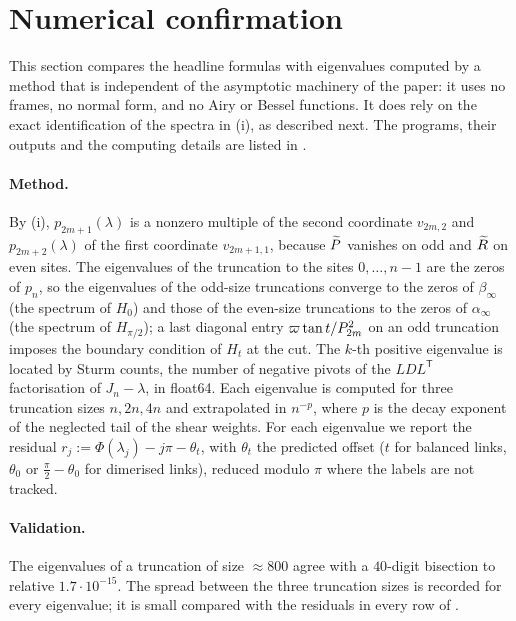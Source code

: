 \section{Numerical confirmation}\label{sec:numerics}

This section compares the headline formulas with eigenvalues computed by a method that is independent
of the asymptotic machinery of the paper: it uses no frames, no normal form, and no Airy or Bessel
functions. It does rely on the exact identification of the spectra in (i), as described
next. The programs, their outputs and the computing details are listed in .

\paragraph{Method.} By (i), $p_{2m+1}(\lambda)$ is a nonzero multiple of the second
coordinate $v_{2m,2}$ and $p_{2m+2}(\lambda)$ of the first coordinate $v_{2m+1,1}$, because $\widetilde P$ vanishes on
odd and $\widetilde R$ on even sites. The eigenvalues of the truncation to the sites $0,\dots,n-1$ are the
zeros of $p_n$, so the eigenvalues of the odd-size truncations converge to the zeros of
$\beta_\infty$ (the spectrum of $H_0$) and those of the even-size truncations to the zeros of
$\alpha_\infty$ (the spectrum of $H_{\pi/2}$); a last diagonal entry $\varpi\tan t/P_{2m}^2$ on an odd truncation
imposes the boundary condition of $H_t$ at the cut. The $k$-th positive eigenvalue is located by
Sturm counts, the number of negative pivots of the $LDL^{\mathsf T}$ factorisation of $J_n-\lambda$, in
float64. Each eigenvalue is computed for three truncation sizes $n,2n,4n$ and extrapolated in $n^{-p}$,
where $p$ is the decay exponent of the neglected tail of the shear weights. For each eigenvalue we
report the residual $r_j:=\Phi(\lambda_j)-j\pi-\theta_t$, with $\theta_t$ the predicted offset ($t$ for balanced
links, $\theta_0$ or $\frac\pi2-\theta_0$ for dimerised links), reduced modulo $\pi$ where the labels are not
tracked.

\paragraph{Validation.} The eigenvalues of a truncation of size $\approx800$ agree with a $40$-digit
bisection to relative $1.7\cdot10^{-15}$. The spread between the three truncation sizes is
recorded for every eigenvalue; it is small compared with the residuals in every row of
.

